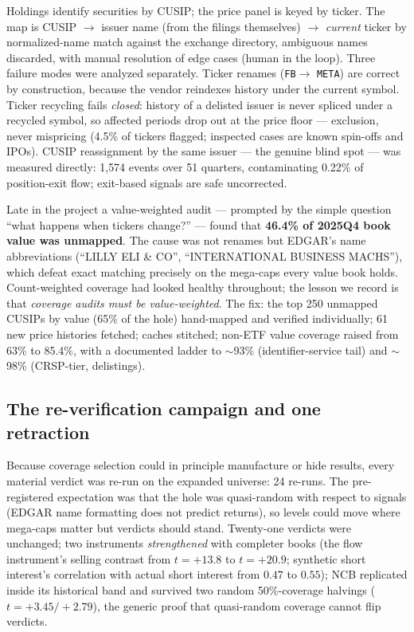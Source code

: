 Holdings identify securities by CUSIP; the price panel is keyed by
ticker. The map is CUSIP $\to$ issuer name (from the filings
themselves) $\to$ \emph{current} ticker by normalized-name match
against the exchange directory, ambiguous names discarded, with
manual resolution of edge cases (human in the loop). Three failure
modes were analyzed separately. Ticker renames (\texttt{FB}$\to$%
\texttt{META}) are correct by construction, because the vendor
reindexes history under the current symbol. Ticker recycling fails
\emph{closed}: history of a delisted issuer is never spliced under a
recycled symbol, so affected periods drop out at the price floor ---
exclusion, never mispricing (4.5\% of tickers flagged; inspected
cases are known spin-offs and IPOs). CUSIP reassignment by the same
issuer --- the genuine blind spot --- was measured directly: 1{,}574
events over 51 quarters, contaminating 0.22\% of position-exit flow;
exit-based signals are safe uncorrected.

Late in the project a value-weighted audit --- prompted by the simple
question ``what happens when tickers change?'' --- found that
\textbf{46.4\% of 2025Q4 book value was unmapped}. The cause was not
renames but EDGAR's name abbreviations (``LILLY ELI \& CO'',
``INTERNATIONAL BUSINESS MACHS''), which defeat exact matching
precisely on the mega-caps every value book holds. Count-weighted
coverage had looked healthy throughout; the lesson we record is that
\emph{coverage audits must be value-weighted}. The fix: the top 250
unmapped CUSIPs by value (65\% of the hole) hand-mapped and verified
individually; 61 new price histories fetched; caches stitched;
non-ETF value coverage raised from 63\% to 85.4\%, with a documented
ladder to $\sim$93\% (identifier-service tail) and $\sim$98\%
(CRSP-tier, delistings).

\subsection{The re-verification campaign and one retraction}
\label{sec:campaign}

Because coverage selection could in principle manufacture or hide
results, every material verdict was re-run on the expanded universe:
24 re-runs. The pre-registered expectation was that the hole was
quasi-random with respect to signals (EDGAR name formatting does not
predict returns), so levels could move where mega-caps matter but
verdicts should stand. Twenty-one verdicts were unchanged; two
instruments \emph{strengthened} with completer books (the flow
instrument's selling contrast from $t=+13.8$ to $t=+20.9$; synthetic
short interest's correlation with actual short interest from $0.47$
to $0.55$); NCB replicated inside its historical band and survived
two random 50\%-coverage halvings ($t=+3.45/+2.79$), the generic
proof that quasi-random coverage cannot flip verdicts.

